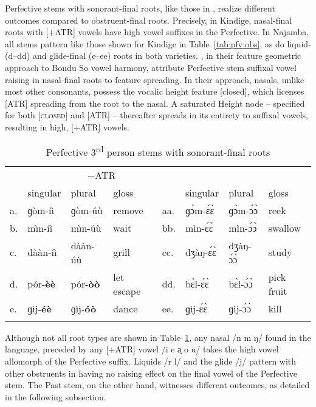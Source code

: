\documentclass[output=paper,colorlinks,citecolor=brown]{langscibook}
\begin{document}
Perfective stems with sonorant-final roots, like those in , realize different outcomes compared to obstruent-final roots. Precisely, in Kindige, nasal-final roots with [+ATR] vowels have high vowel suffixes in the Perfective. In Najamba, all stems pattern like those shown for Kindige in Table~\ref{tab:pfv:obs}, as do liquid- (d--dd) and glide-final (e--ee) roots in both varieties. \citet{GreenHantgan}, in their  feature geometric approach to Bondu So vowel harmony, attribute Perfective stem suffixal vowel raising in nasal-final roots to feature spreading. In their approach, nasals, unlike most other consonants, possess the vocalic height feature [closed], which licenses [ATR] spreading from the root to the nasal. A saturated Height node -- specified for both [\textsc{closed}] and [ATR] -- thereafter spreads in its entirety to suffixal vowels, resulting in high, [+ATR] vowels.

\begin{table}
\caption{Perfective 3\textsuperscript{rd} person stems with sonorant-final roots}
\label{tab:pfv:son}
\begin{tabular}{ *2{l@{~~}lll} } 
    \lsptoprule
    \multicolumn{4}{c}{+ATR}&\multicolumn{4}{c}{−ATR}\\\cmidrule(lr){1-4}\cmidrule(lr){5-8}
    & singular & plural & gloss & & singular & plural & gloss \\
    \midrule
    a.	&	ɡòm-íì	&	ɡòm-úù	&	remove	&	aa.	&	ɡɔ̀m-ɛ́ɛ̀	&	ɡɔ̀m-ɔ́ɔ̀	&	reek	\\
    b.	&	mı̀n-íì	&	mı̀n-úù	&	wait	&	bb.	&	mìn-ɛ́ɛ̀	&	mìn-ɔ́ɔ̀	&	swallow	\\
    c.	&	dààn-íì	&	dààn-úù	&	grill	&	cc.	&	dʒàŋ-ɛ́ɛ̀	&	dʒàŋ-ɔ́ɔ̀	&	study	\\\addlinespace
    d.	&	pór-\textbf{èè}	&	pór-\textbf{òò}	&	let escape	&	dd.	&	bɛ̀l-ɛ́ɛ̀	&	bɛ̀l-ɔ́ɔ̀	&	pick fruit	\\
    e.	&	ɡìj-\textbf{éè}	&	ɡìj-\textbf{óò}	&	dance	&	ee.	&	ɡìj-ɛ́ɛ̀	&	ɡìj-ɔ́ɔ̀	&	kill	\\
    \lspbottomrule
\end{tabular}
\end{table}

Although not all root types are shown in Table~\ref{tab:pfv:son}, any nasal /n m ŋ/ found in the language, preceded by any [+ATR] vowel /i e a̘ o u/ takes the high vowel allomorph of the Perfective suffix. Liquids /r l/ and the glide /j/ pattern with other obstruents in having no raising effect on the final vowel of the Perfective stem. The Past stem, on the other hand, witnesses different outcomes, as detailed in the following subsection. 
\end{document}
